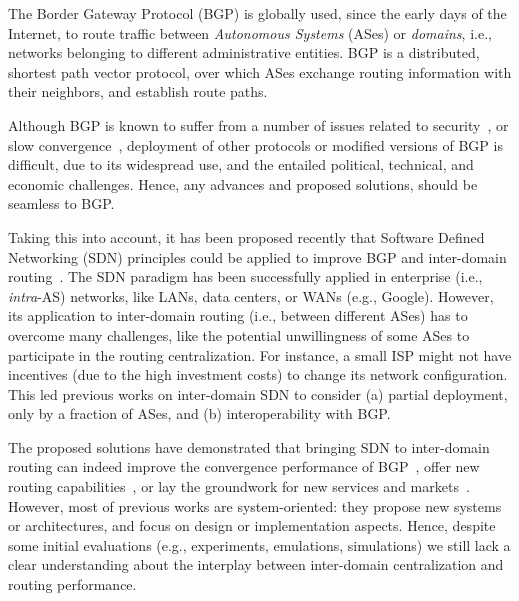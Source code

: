 The Border Gateway Protocol (BGP) is globally used, since the early days of the Internet, to route  traffic between \textit{Autonomous Systems} (ASes) or \textit{domains}, i.e., networks belonging to different administrative entities. BGP is a distributed, shortest path vector protocol, over which ASes exchange routing information with their neighbors, and establish route paths. 

Although BGP is known to suffer from a number of issues related to security~\cite{Kent-secure-BGP-JSAC-2000,Subramanian-listen-whisper-NSDI-2004}, or slow convergence~\cite{Labozitz-Delayed-convergence-CCR-2000,Kushman-Can-Hear-CCR-2007,Oliveira-Quantifying-Path-Exploration-ToN-2009}, deployment of other protocols or modified versions of BGP is difficult, due to its widespread use, and the entailed political, technical, and economic challenges. Hence, any advances and proposed solutions, should be seamless to BGP.%

Taking this into account, it has been proposed recently that Software Defined Networking (SDN) principles could be applied to improve BGP and inter-domain routing~\cite{Gupta-SDX-CCR-2014,Kotronis-CXP-SOSR-2016,Thai-Decoupling-BGP-Conext-2012,Rothenberg-Revisiting-RCP-HotSDN-2012,Bennesby-Innovating-IDrouting-AINA-2014,Lin-Seamless-Internetworking-Demo-Sigcomm-2013}. The SDN paradigm has been successfully applied in enterprise (i.e., \textit{intra}-AS) networks, like LANs, data centers, or WANs (e.g., Google). However, its application to inter-domain routing (i.e., between different ASes) has to overcome many challenges, like the potential unwillingness of some ASes to participate in the routing centralization. For instance, a small ISP might not have incentives (due to the high investment costs) to change its network configuration. This led previous works on inter-domain SDN to consider (a) partial deployment, only by a fraction of ASes, and (b) interoperability with BGP.

The proposed solutions have demonstrated that bringing SDN to inter-domain routing can indeed improve the convergence performance of BGP~\cite{Kotronis-Routing-Centralization-ComNets-2015}, offer new routing capabilities~\cite{Gupta-SDX-CCR-2014}, or lay the groundwork for new services and markets~\cite{Gibb-Outsourcing-NF-HotSDN-2012,Kotronis-CXP-SOSR-2016}. However, most of previous works are system-oriented: they propose new systems or architectures, and focus on design or implementation aspects. Hence, despite some initial evaluations (e.g., experiments, emulations, simulations) we still lack a clear understanding about the interplay between inter-domain centralization and routing performance.

